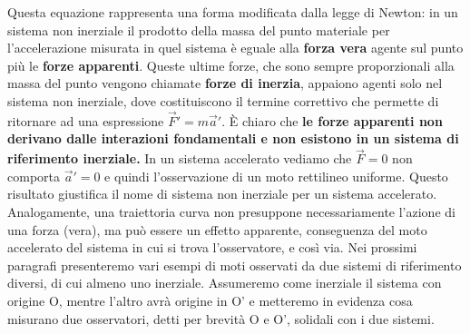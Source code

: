 \documentclass{article}
\numberwithin{equation}{subsection}
\begin{document}
Questa equazione rappresenta una forma modificata dalla legge di Newton: in un sistema non inerziale il prodotto della massa del punto materiale per l'accelerazione misurata in quel sistema è eguale alla \textbf{forza vera} agente sul punto più le \textbf{forze apparenti}. Queste ultime forze, che sono sempre proporzionali alla massa del punto vengono chiamate \textbf{forze di inerzia}, appaiono agenti solo nel sistema non inerziale, dove costituiscono il termine correttivo che permette di ritornare ad una espressione $\vec{F}'=m\vec{a}'$. È chiaro che \textbf{le forze apparenti non derivano dalle interazioni fondamentali e non esistono in un sistema di riferimento inerziale.} In un sistema accelerato vediamo che $\vec{F}=0$ non comporta $\vec{a}'=0$ e quindi l'osservazione di un moto rettilineo uniforme. Questo risultato giustifica il nome di sistema non inerziale per un sistema accelerato. Analogamente, una traiettoria curva non presuppone necessariamente l'azione di una forza (vera), ma può essere un effetto apparente, conseguenza del moto accelerato del sistema in cui si trova l'osservatore, e così via. Nei prossimi paragrafi presenteremo vari esempi di moti osservati da due sistemi di riferimento diversi, di cui almeno uno inerziale. Assumeremo come inerziale il sistema con origine O, mentre l'altro avrà origine in O' e metteremo in evidenza cosa misurano due osservatori, detti per brevità O e O', solidali con i due sistemi.
\end{document}

